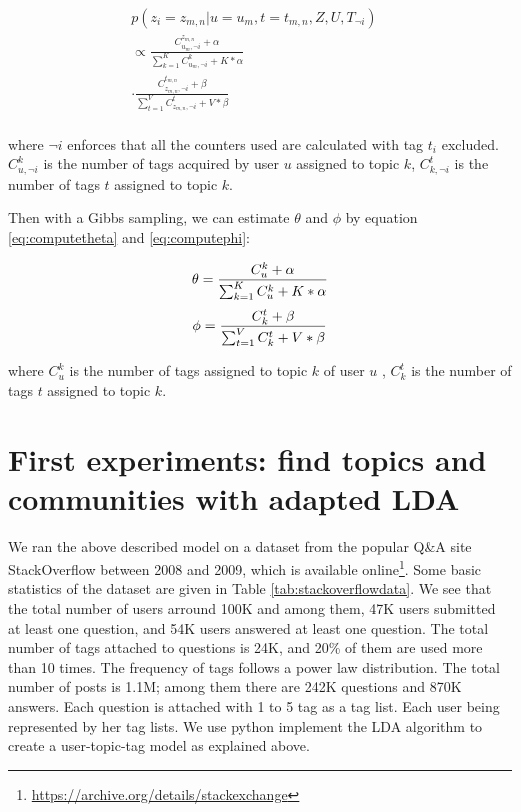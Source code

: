 \begin{equation}
\begin{split}
p(z_i= z_{m,n} |u=u_m, t=t_{m,n}, Z, U, T_{\neg i}) &\\
\propto \frac{ C_{u_m,\neg i}^{z_{m,n}} + \alpha }{ \sum_{k=1}^K C_{u_m,\neg i}^k + K* \alpha} &\\
\cdot   \frac{ C_{z_{m,n},\neg i}^{t_{m,n}} + \beta }{ \sum_{t=1}^V C_{z_{m,n},\neg i}^t + V* \beta} &\\ 
\end{split}
\label{eq:ldasample}
\end{equation}

\noindent
where $\neg i$ enforces that all the counters used are calculated with tag $t_i$ excluded. $C_{u,\neg i}^k$ is the number of tags acquired by user $u$ assigned to topic $k$, $C_{k,\neg i}^{t}$ is the number of tags $t$ assigned to topic $k$.

Then with a Gibbs sampling, we can estimate $\theta$ and $\phi$ by equation \ref{eq:computetheta} and \ref{eq:computephi}:

\begin{equation}\scriptsize
\theta=\frac{ C_u^k + \alpha}{ \sum_{k=1}^K C_u^k+ K* \alpha}
\label{eq:computetheta} 
\end{equation}
\begin{equation}\scriptsize
\phi =\frac{ C_k^t + \beta}{ \sum_{t=1}^V C_k^t+ V* \beta}
\label{eq:computephi} 
\end{equation}

\noindent
where $C_u^k$ is the number of tags assigned to topic $k$ of user $u$ , $C_k^t$ is the number of tags $t$ assigned to topic $k$.


\section{First experiments: find topics and communities with adapted LDA}

We ran the above described model on a dataset from the popular Q\&A site StackOverflow between 2008 and 2009, which is available online\footnote{\url{https://archive.org/details/stackexchange}}. Some basic statistics of the dataset are given in Table \ref{tab:stackoverflowdata}. We see that the total number of users arround 100K and among them, 47K users submitted at least one question, and 54K users answered at least one question. The total number of tags attached to questions is 24K, and 20\% of them are used more than 10 times. The frequency of tags follows a power law distribution. The total number of posts is 1.1M; among them there are 242K questions and 870K answers. Each question is attached with 1 to 5 tag as a tag list. Each user being represented by her tag lists. We use python implement the LDA algorithm to create a user-topic-tag model as explained above.


